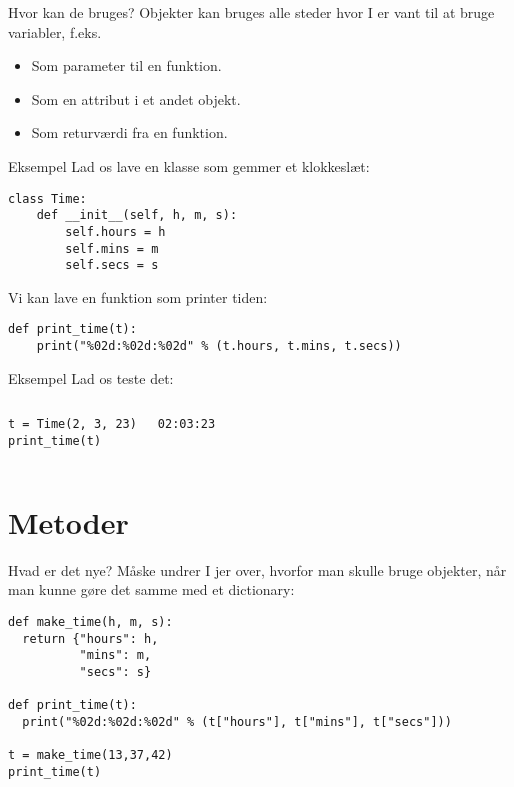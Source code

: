 \documentclass[main.tex]{subfiles}
\begin{document}
\begin{frame}{Hvor kan de bruges?}
	Objekter kan bruges alle steder hvor I er vant til at bruge variabler, f.eks.
	\begin{itemize}
		\item Som parameter til en funktion.
		\item Som en attribut i et andet objekt.
		\item Som returværdi fra en funktion.
	\end{itemize}
\end{frame}

\begin{frame}[fragile]{Eksempel}
	Lad os lave en klasse som gemmer et klokkeslæt:
		\begin{lstlisting}[style=python]
class Time:
	def __init__(self, h, m, s):
		self.hours = h
		self.mins = m
		self.secs = s
	\end{lstlisting}
	\pause
	Vi kan lave en funktion som printer tiden:
	\begin{lstlisting}[style=python]
def print_time(t):
	print("%02d:%02d:%02d" % (t.hours, t.mins, t.secs))
	\end{lstlisting}
\end{frame}

\begin{frame}[fragile]{Eksempel}
Lad os teste det:
\begin{columns}
	\begin{lstlisting}[style=python]
t = Time(2, 3, 23)
print_time(t)
	\end{lstlisting}
	\begin{lstlisting}[style=python]
02:03:23
	\end{lstlisting}
\end{columns}
\end{frame}




\section{Metoder}



\begin{frame}[fragile]{Hvad er det nye?}
Måske undrer I jer over, hvorfor man skulle bruge objekter, når man kunne gøre det samme med et dictionary:

\begin{lstlisting}[style=python]
def make_time(h, m, s):
  return {"hours": h, 
          "mins": m, 
          "secs": s}

def print_time(t):
  print("%02d:%02d:%02d" % (t["hours"], t["mins"], t["secs"]))

t = make_time(13,37,42)
print_time(t)
\end{lstlisting}
\end{frame}
\end{document}
